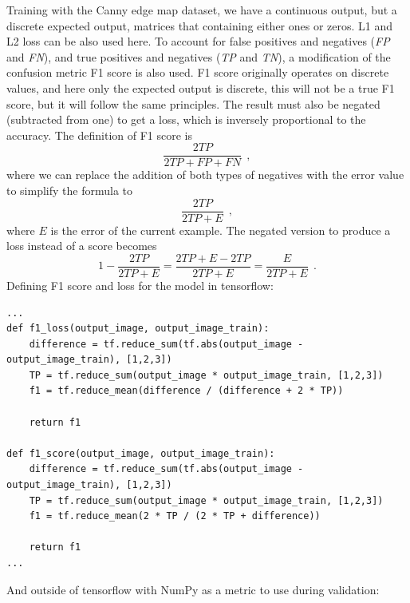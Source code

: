 \documentclass[12pt]{report}
\begin{document}
Training with the Canny edge map dataset, we have a continuous output, but a discrete expected output, matrices that containing either ones or zeros. L1 and L2 loss can be also used here. To account for false positives and negatives (\textit{FP} and \textit{FN}), and true positives and negatives (\textit{TP} and \textit{TN}), a modification of the confusion metric F1 score is also used. F1 score originally operates on discrete values, and here only the expected output is discrete, this will not be a true F1 score, but it will follow the same principles. The result must also be negated (subtracted from one) to get a loss, which is inversely proportional to the accuracy. The definition of F1 score is
\begin{equation*}
	\frac{2TP}{2TP + FP + FN}\ \ ,
\end{equation*}
where we can replace the addition of both types of negatives with the error value to simplify the formula to
\begin{equation*}
	\frac{2TP}{2TP + E}\ \ ,
\end{equation*}
where $ E $ is the error of the current example. The negated version to produce a loss instead of a score becomes
\begin{equation*}
	1 - \frac{2TP}{2TP + E} = \frac{2TP + E - 2TP}{2TP + E} = \frac{E}{2TP + E}\ \ .
\end{equation*}
Defining F1 score and loss for the model in tensorflow:
\begin{center}
	\begin{minipage}{0.95\textwidth}
		\begin{lstlisting}[title=fcn\_model.py]
...
def f1_loss(output_image, output_image_train):
	difference = tf.reduce_sum(tf.abs(output_image - output_image_train), [1,2,3])
	TP = tf.reduce_sum(output_image * output_image_train, [1,2,3])
	f1 = tf.reduce_mean(difference / (difference + 2 * TP))

	return f1

def f1_score(output_image, output_image_train):
	difference = tf.reduce_sum(tf.abs(output_image - output_image_train), [1,2,3])
	TP = tf.reduce_sum(output_image * output_image_train, [1,2,3])
	f1 = tf.reduce_mean(2 * TP / (2 * TP + difference))

	return f1
...
		\end{lstlisting}
	\end{minipage}
\end{center}
And outside of tensorflow with NumPy as a metric to use during validation:
\end{document}
